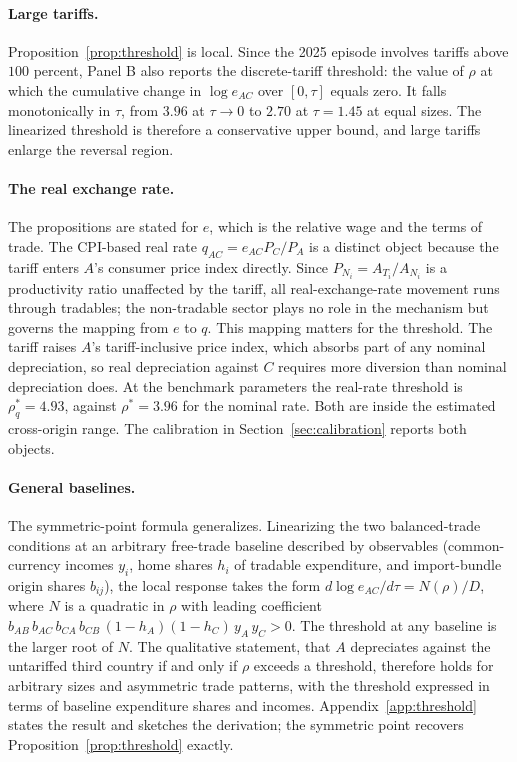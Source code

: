 \documentclass[11pt]{article}
\theoremstyle{plain}
\theoremstyle{remark}
\numberwithin{lemma}{section}
\numberwithin{proposition}{section}
\numberwithin{corollary}{section}
\newenvironment{revblock}{\par\begingroup\color{RevBlue}}{\endgroup\par}
\begin{document}
\begin{revblock}
\paragraph{Large tariffs.} Proposition~\ref{prop:threshold} is local. Since the 2025 episode involves tariffs above $100$ percent, Panel B also reports the discrete-tariff threshold: the value of $\rho$ at which the cumulative change in $\log e_{AC}$ over $[0,\tau]$ equals zero. It falls monotonically in $\tau$, from $3.96$ at $\tau \to 0$ to $2.70$ at $\tau = 1.45$ at equal sizes. The linearized threshold is therefore a conservative upper bound, and large tariffs enlarge the reversal region.

\paragraph{The real exchange rate.} The propositions are stated for $e$, which is the relative wage and the terms of trade. The CPI-based real rate $q_{AC} = e_{AC} P_C / P_A$ is a distinct object because the tariff enters $A$'s consumer price index directly. Since $P_{N_i} = A_{T_i}/A_{N_i}$ is a productivity ratio unaffected by the tariff, all real-exchange-rate movement runs through tradables; the non-tradable sector plays no role in the mechanism but governs the mapping from $e$ to $q$. This mapping matters for the threshold. The tariff raises $A$'s tariff-inclusive price index, which absorbs part of any nominal depreciation, so real depreciation against $C$ requires more diversion than nominal depreciation does. At the benchmark parameters the real-rate threshold is $\rho^*_q = 4.93$, against $\rho^* = 3.96$ for the nominal rate. Both are inside the estimated cross-origin range. The calibration in Section~\ref{sec:calibration} reports both objects.

\paragraph{General baselines.} The symmetric-point formula generalizes. Linearizing the two balanced-trade conditions at an arbitrary free-trade baseline described by observables (common-currency incomes $y_i$, home shares $h_i$ of tradable expenditure, and import-bundle origin shares $b_{ij}$), the local response takes the form $d\log e_{AC}/d\tau = N(\rho)/D$, where $N$ is a quadratic in $\rho$ with leading coefficient $b_{AB}\, b_{AC}\, b_{CA}\, b_{CB}\, (1-h_A)(1-h_C)\, y_A\, y_C > 0$. The threshold at any baseline is the larger root of $N$. The qualitative statement, that $A$ depreciates against the untariffed third country if and only if $\rho$ exceeds a threshold, therefore holds for arbitrary sizes and asymmetric trade patterns, with the threshold expressed in terms of baseline expenditure shares and incomes. Appendix~\ref{app:threshold} states the result and sketches the derivation; the symmetric point recovers Proposition~\ref{prop:threshold} exactly.
\end{revblock}
\end{document}
